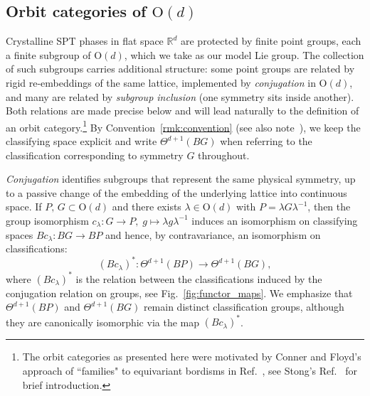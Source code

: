 \documentclass[aps,prx,reprint,superscriptaddress,twocolumn,amsmath,amssymb,amsfonts, nofootinbib]{revtex4-2}
\theoremstyle{apsstyle}
\begin{document}
\subsection{Orbit categories of $\mathrm{O}(d)$}\label{sec:orbit_categories}

Crystalline SPT phases in flat space $\mathbb{R}^{d}$ are protected by finite point groups, each a finite subgroup of $\mathrm{O}(d)$, which we take as our model Lie group. The collection of such subgroups carries additional structure: some point groups are related by rigid re-embeddings of the same lattice, implemented by \textit{conjugation} in $\mathrm{O}(d)$, and many are related by \emph{subgroup inclusion} (one symmetry sits inside another). Both relations are made precise below and will lead naturally to the definition of an orbit category.\footnote{The orbit categories as presented here were motivated by Conner and Floyd's approach of ``families" to equivariant bordisms in Ref.~\cite{Conner1979}, see Stong's Ref.~\cite{Stong1970} for brief introduction.} By Convention~\ref{rmk:convention} (see also note~\cite{note_functor}), we keep the classifying space explicit and write $\Theta^{d+1}(BG)$ when referring to the classification corresponding to symmetry $G$ throughout.


\bigskip

\textit{Conjugation} identifies subgroups that represent the same physical symmetry, up to a passive change of the embedding of the underlying lattice into continuous space. If $P,\,G\subset \mathrm{O}(d)$ and there exists $\lambda\in \mathrm{O}(d)$ with $P=\lambda G\lambda^{-1}$, then the group isomorphism $c_{\lambda }: G \to P,\; g\mapsto \lambda g\lambda ^{-1}$ induces an isomorphism on classifying spaces $B c_{\lambda }: BG \to BP$ and hence, by contravariance, an isomorphism on classifications:
\begin{equation*}
    (Bc_{\lambda})^{*}: \Theta^{d+1}(BP) \to \Theta^{d+1}(BG) ,
\end{equation*}
where $(Bc_{\lambda})^{*}$ is the relation between the classifications induced by the conjugation relation on groups, see Fig.~\ref{fig:functor_maps}. We emphasize that $\Theta^{d+1}(BP)$ and $\Theta^{d+1}(BG)$ remain distinct classification groups, although they are canonically isomorphic via the map $(Bc_{\lambda})^{*}$. 

\bigskip
\end{document}
